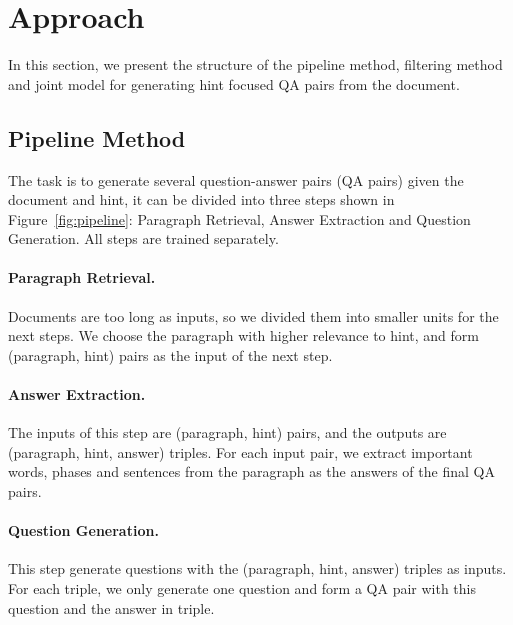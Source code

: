 \section{Approach}
\label{sec:method}

In this section, we present the structure of the pipeline method, filtering method and joint model for generating hint focused QA pairs from the document.

\subsection{Pipeline Method}
\label{sec:pipeline}
The task is to generate several question-answer pairs (QA pairs) given the document and hint, it can be divided into three steps shown in Figure~\ref{fig:pipeline}: Paragraph Retrieval, Answer Extraction and Question Generation. All steps are trained separately.
\paragraph{Paragraph Retrieval.} Documents are too long as inputs, so we divided them into smaller units for the next steps. We choose the paragraph with higher relevance to hint, and form (paragraph, hint) pairs as the input of the next step.
\paragraph{Answer Extraction.} The inputs of this step are (paragraph, hint) pairs, and the outputs are (paragraph, hint, answer) triples. For each input pair, we extract important words, phases and sentences from the paragraph as the answers of the final QA pairs.
\paragraph{Question Generation.} This step generate questions with the (paragraph, hint, answer) triples as inputs. For each triple, we only generate one question and form a QA pair with this question and the answer in triple.



